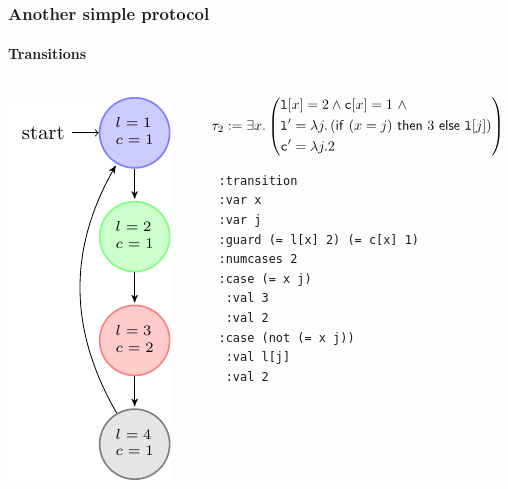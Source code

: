 \begin{frame}[fragile]
  \frametitle{Another simple protocol}
  \framesubtitle{Transitions}

\begin{columns}
\begin{column}{0.3\textwidth}
\centering
\includegraphics{pictures/demo-prot2-fig}
\end{column}
\begin{column}{0.7\textwidth}
  


{\footnotesize
$$
\tau_2:= \exists x. \left(
\begin{aligned}
& {\tt l}[x] = 2 \wedge {\tt c}[x] = 1\ \wedge \\
& {\tt l}' = \lambda j. \left({\sf if}~(x = j)~{\sf then}~3~{\sf else}~{\tt l}[j]\right) \\
& {\tt c}' = \lambda j. 2
\end{aligned}
\right)
$$
}

\vspace{-14pt}

\pause
 {\footnotesize 
  \begin{verbatim}
  :transition
  :var x
  :var j
  :guard (= l[x] 2) (= c[x] 1)
  :numcases 2
  :case (= x j)
   :val 3
   :val 2
  :case (not (= x j))
   :val l[j]
   :val 2
  \end{verbatim}
 }
\end{column}

\end{columns}  

\end{frame}





